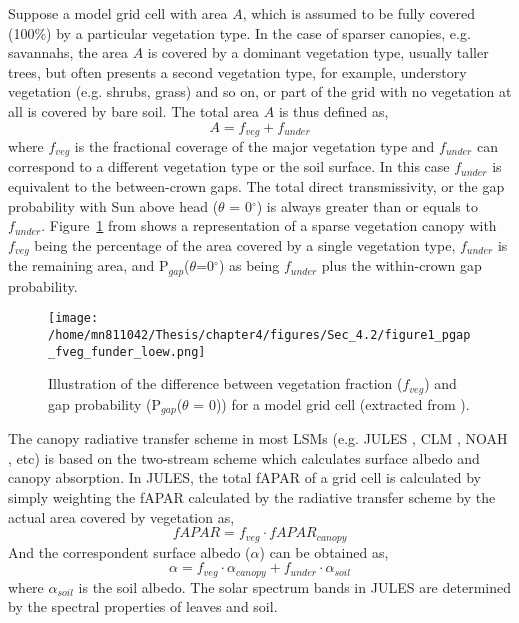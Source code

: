 Suppose a model grid cell with area $A$, which is assumed to be fully covered (100\%) by a particular vegetation type. In the case of sparser canopies, e.g. savannahs, the area $A$ is covered by a dominant vegetation type, usually taller trees, but often presents a second vegetation type, for example, understory vegetation (e.g. shrubs, grass) and so on, or part of the grid with no vegetation at all is covered by bare soil. The total area $A$ is thus defined as,
\begin{equation}
A = f_{veg} + f_{under}
\label{equation:area}
\end{equation}
\noindent where $f_{veg}$ is the fractional coverage of the major vegetation type and $f_{under}$ can correspond to a different vegetation type or the soil surface.
In this case $f_{under}$ is equivalent to the between-crown gaps. The total direct transmissivity, or the gap probability with Sun above head ($\theta$ = 0$^{\circ}$) is always greater than or equals to $f_{under}$. Figure~\ref{f:loew2014} from \citet{loew2014} shows a representation of a sparse vegetation canopy with $f_{veg}$ being the percentage of the area covered by a single vegetation type, $f_{under}$ is the remaining area, and P$_{gap}$($\theta$=0$^{\circ}$) as being $f_{under}$ plus the within-crown gap probability.

\begin{figure}
\centering
\texttt{[image: /home/mn811042/Thesis/chapter4/figures/Sec\_4.2/figure1\_pgap\_fveg\_funder\_loew.png]}
\caption{Illustration of the difference between vegetation fraction ($f_{veg}$) and gap probability (P$_{gap}$($\theta$ = 0)) for a model grid cell (extracted from \citet{loew2014}).} 
\label{f:loew2014}
\end{figure}

The canopy radiative transfer scheme in most LSMs (e.g. JULES \citep{Clark2011}, CLM \citep{Bonan2002}, NOAH \citep{Niu2011}, etc)  is based on the two-stream scheme \citep{sellers1985} which calculates surface albedo and canopy absorption. In JULES, the total fAPAR of a grid cell is calculated by simply weighting the fAPAR calculated by the radiative transfer scheme by the actual area covered by vegetation as, 
\begin{equation}
fAPAR = f_{veg} \cdot fAPAR_{canopy}
\label{equation:faparvegfraction}
\end{equation}
And the correspondent surface albedo ($\alpha$) can be obtained as, 
\begin{equation}
\alpha = f_{veg} \cdot \alpha_{canopy}  +  f_{under} \cdot \alpha_{soil}
\label{equation:albedovegfraction}
\end{equation}
\noindent where $\alpha_{soil}$ is the soil albedo. The solar spectrum bands in JULES are determined by the spectral properties of leaves and soil.

